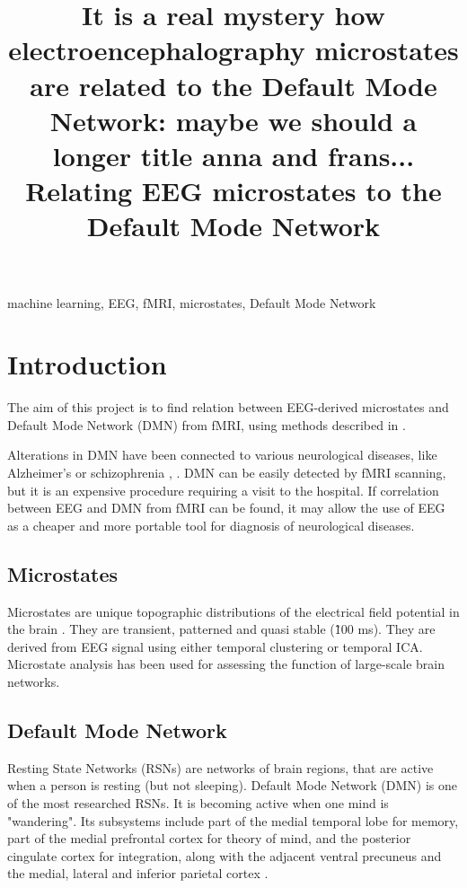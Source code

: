 \documentclass{article}
\title{It is a real mystery how electroencephalography microstates are related to the Default Mode Network: maybe we should a longer title anna and frans... Relating EEG microstates to the Default Mode Network}
\begin{document}
%

\maketitle
%
\begin{abstract}

\end{abstract}
%
\begin{keywords}
machine learning, EEG, fMRI, microstates, Default Mode Network
\end{keywords}
%
\section{Introduction}
The aim of this project is to find relation between EEG-derived microstates and Default Mode Network (DMN) from fMRI, using methods described in \cite{Yuan20122062}.

Alterations in DMN have been connected to various neurological diseases, like Alzheimer’s or schizophrenia \cite{Yuan20122062}, \cite{Khanna2015105}. DMN can be easily detected by fMRI scanning, but it is an expensive procedure requiring a visit to the hospital. If correlation between EEG and DMN from fMRI can be found, it may allow the use of EEG as a cheaper and more portable tool for diagnosis of neurological diseases.

\subsection{Microstates}
Microstates are unique topographic distributions of the electrical field potential in the brain  \cite{Khanna2015105}. They are transient, patterned and quasi stable (\~100 ms). They are derived from EEG signal using either temporal clustering or temporal ICA. Microstate analysis has been used for assessing the function of large-scale brain networks.

\subsection{Default Mode Network}
Resting State Networks (RSNs) are networks of brain regions, that are active when a person is resting (but not sleeping). Default Mode Network (DMN) is one of the most researched RSNs. It is becoming active when one mind is "wandering". Its subsystems include part of the medial temporal lobe for memory, part of the medial prefrontal cortex for theory of mind, and the posterior cingulate cortex for integration, along with the adjacent ventral precuneus and the medial, lateral and inferior parietal cortex \cite{dmn_description}.
\end{document}
